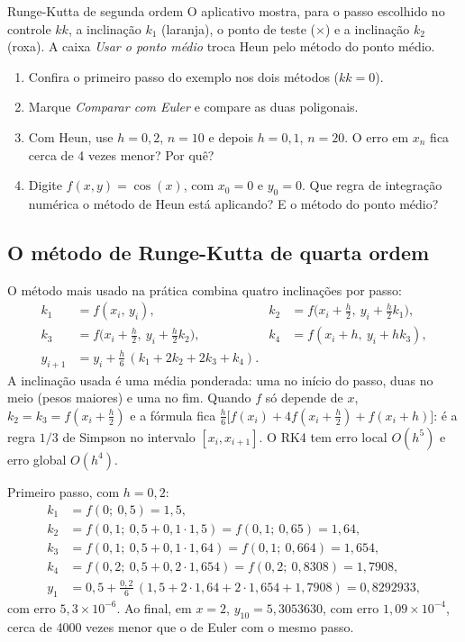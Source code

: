 \begin{atividade}{Runge-Kutta de segunda ordem}{\arqRKdois}
O aplicativo mostra, para o passo escolhido no controle $kk$, a inclinação $k_1$ (laranja), o
ponto de teste ($\times$) e a inclinação $k_2$ (roxa). A caixa \emph{Usar o ponto médio}
troca Heun pelo método do ponto médio.
\begin{enumerate}[nosep]
  \item Confira o primeiro passo do exemplo nos dois métodos ($kk=0$).
  \item Marque \emph{Comparar com Euler} e compare as duas poligonais.
  \item Com Heun, use $h=0{,}2$, $n=10$ e depois $h=0{,}1$, $n=20$. O erro em $x_n$ fica
        cerca de 4 vezes menor? Por quê?
  \item Digite $f(x,y)=\cos(x)$, com $x_0=0$ e $y_0=0$. Que regra de integração numérica o
        método de Heun está aplicando? E o método do ponto médio?
\end{enumerate}
\end{atividade}

\subsection{O método de Runge-Kutta de quarta ordem}

O método mais usado na prática combina quatro inclinações por passo:
\[
\boxed{\;
\begin{aligned}
k_1&=f(x_i,\,y_i), & k_2&=f\bigl(x_i+\tfrac h2,\ y_i+\tfrac h2k_1\bigr),\\
k_3&=f\bigl(x_i+\tfrac h2,\ y_i+\tfrac h2k_2\bigr), & k_4&=f(x_i+h,\ y_i+hk_3),\\
y_{i+1}&=y_i+\frac h6\,(k_1+2k_2+2k_3+k_4). & &
\end{aligned}\;}
\]
A inclinação usada é uma média ponderada: uma no início do passo, duas no meio (pesos maiores)
e uma no fim. Quando $f$ só depende de $x$, $k_2=k_3=f(x_i+\frac h2)$ e a fórmula fica
$\frac h6\bigl[f(x_i)+4f(x_i+\frac h2)+f(x_i+h)\bigr]$: é a regra $1/3$ de Simpson no intervalo
$[x_i,x_{i+1}]$. O RK4 tem erro local $O(h^5)$ e erro global $O(h^4)$.

\begin{exemplo}
Primeiro passo, com $h=0{,}2$:
\begin{align*}
k_1&=f(0;\ 0{,}5)=1{,}5,\\
k_2&=f(0{,}1;\ 0{,}5+0{,}1\cdot1{,}5)=f(0{,}1;\ 0{,}65)=1{,}64,\\
k_3&=f(0{,}1;\ 0{,}5+0{,}1\cdot1{,}64)=f(0{,}1;\ 0{,}664)=1{,}654,\\
k_4&=f(0{,}2;\ 0{,}5+0{,}2\cdot1{,}654)=f(0{,}2;\ 0{,}8308)=1{,}7908,\\
y_1&=0{,}5+\frac{0{,}2}{6}\,(1{,}5+2\cdot1{,}64+2\cdot1{,}654+1{,}7908)=0{,}8292933,
\end{align*}
com erro $5{,}3\times10^{-6}$. Ao final, em $x=2$, $y_{10}=5{,}3053630$, com erro
$1{,}09\times10^{-4}$, cerca de 4000 vezes menor que o de Euler com o mesmo passo.
\end{exemplo}

